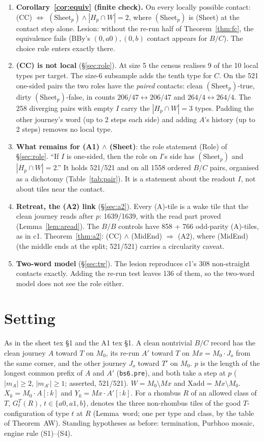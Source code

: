 \documentclass[11pt]{article}
\theoremstyle{definition}\newtheorem{definition}[theorem]{Definition}\newtheorem{remark}[theorem]{Remark}
\begin{document}
\begin{enumerate}
\item \textbf{Corollary~\ref{cor:equiv} (finite check).} On every locally possible contact: (CC) $\iff$ $(\mathrm{Sheet}_p)\wedge|H_p\cap W|=2$, where $(\mathrm{Sheet}_p)$ is (Sheet) at the contact step alone. Lesion: without the re-run half of Theorem~\ref{thm:fc}, the equivalence fails (BBy's $(0,a0),(0,b)$ contact appears for $B/C$). The choice rule enters exactly there.
\item \textbf{(CC) is not local} (\S\ref{sec:role}). At size 5 the census realises 9 of the 10 local types per target. The size-6 subsample adds the tenth type for $C$. On the 521 one-sided pairs the two roles have the \emph{paired} contacts: clean $(\mathrm{Sheet}_p)$-true, dirty $(\mathrm{Sheet}_p)$-false, in counts $206/47\leftrightarrow206/47$ and $264/4\leftrightarrow264/4$. The 258 diverging pairs with empty $I$ carry the $|H_p\cap W|=3$ types. Padding the other journey's word (up to 2 steps each side) and adding $A$'s history (up to 2 steps) removes no local type.
\item \textbf{What remains for (A1) $\wedge$ (Sheet)}: the role statement (Role) of \S\ref{sec:role}. ``If $I$ is one-sided, then the role on $I$'s side has $(\mathrm{Sheet}_p)$ and $|H_p\cap W|=2$.'' It holds 521/521 and on all 1558 ordered $B/C$ pairs, organised as a dichotomy (Table~\ref{tab:pair}). It is a statement about the readout $I$, not about tiles near the contact.
\item \textbf{Retreat, the (A2) link} (\S\ref{sec:a2}). Every (A)-tile is a wake tile that the clean journey reads after $p$: 1639/1639, with the read part proved (Lemma~\ref{lem:aread}). The $B/B$ controls have 858 + 766 odd-parity (A)-tiles, as in c1. Theorem~\ref{thm:a2}: (CC) $\wedge$ (MidEnd) $\Rightarrow$ (A2), where (MidEnd) (the middle ends at the split; 521/521) carries a circularity caveat.
\item \textbf{Two-word model} (\S\ref{sec:tw}). The lesion reproduces c1's 308 non-straight contacts exactly. Adding the re-run test leaves 136 of them, so the two-word model does not see the role either.
\end{enumerate}

\section{Setting}\label{sec:set}
As in the sheet tex \S1 and the A1 tex \S1. A clean nontrivial $B/C$ record has the clean journey $A$ toward $T$ on $M_0$, its re-run $A'$ toward $T$ on $Mx=M_0\cdot J_o$ from the same corner, and the other journey $J_o$ toward $T'$ on $M_0$. $p$ is the length of the longest common prefix of $A$ and $A'$ (\texttt{bs6.pre}), and both take a step at $p$ ($|m_A|\ge2$, $|m_{A'}|\ge1$; asserted, 521/521). $W=M_0\setminus Mx$ and $\mathrm{Xadd}=Mx\setminus M_0$. $X_k=M_0\cdot A[{:}k]$ and $Y_k=Mx\cdot A'[{:}k]$.
For a rhombus $R$ of an allowed class of $T$, $G^T_t(R)$, $t\in\{a0,a1,b\}$, denotes the three non-rhombus tiles of the good $T$-configuration of type $t$ at $R$ (Lemma~word; one per type and class, by the table of Theorem~AW).
Standing hypotheses as before: termination, Purbhoo mosaic, engine rule (S1)--(S4).
\end{document}
